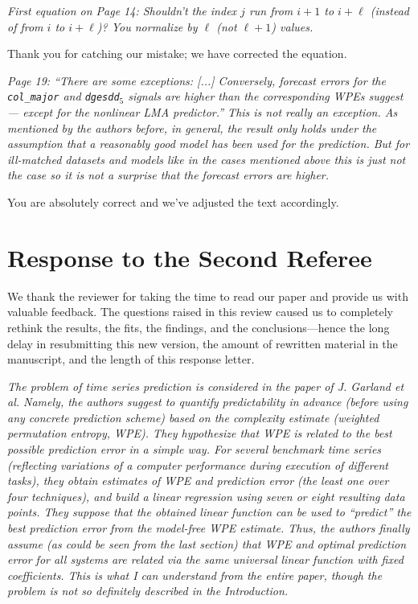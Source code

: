 \documentclass[12pt]{article}
\begin{document}
\emph{First equation on Page 14: Shouldn't the index $j$ run from $i+1$ to
$i+\ell$ (instead of from $i$ to $i+\ell$)? You normalize by $\ell$ (not
$\ell+1$) values.}

Thank you for catching our mistake; we have corrected the equation.

\smallskip

\emph{Page 19: ``There are some exceptions: [...] Conversely, forecast errors
for the \texttt{col\_major} and \texttt{dgesdd$_5$} signals are higher than the
corresponding WPEs suggest --- except for the nonlinear LMA predictor.'' This is
not really an exception. As mentioned by the authors before, in general, the
result only holds under the assumption that a reasonably good model has been
used for the prediction. But for ill-matched datasets and models like in the
cases mentioned above this is just not the case so it is not a surprise that the
forecast errors are higher.}

You are absolutely correct and we've adjusted the text accordingly.

\section*{Response to the Second Referee}

We thank the reviewer for taking the time to read our paper and
provide us with valuable feedback.  The questions raised in this
review caused us to completely rethink the results, the fits, the
findings, and the conclusions---hence the long delay in resubmitting
this new version, the amount of rewritten material in the manuscript,
and the length of this response letter.

\smallskip

\emph{The problem of time series prediction is considered in the paper
  of J.  Garland et al. Namely, the authors suggest to quantify
  predictability in advance (before using any concrete prediction
  scheme) based on the complexity estimate (weighted permutation
  entropy, WPE). They hypothesize that WPE is related to the best
  possible prediction error in a simple way. For several benchmark
  time series (reflecting variations of a computer performance during
  execution of different tasks), they obtain estimates of WPE and
  prediction error (the least one over four techniques), and build a
  linear regression using seven or eight resulting data points. They
  suppose that the obtained linear function can be used to ``predict''
  the best prediction error from the model-free WPE estimate.  Thus,
  the authors finally assume (as could be seen from the last section)
  that WPE and optimal prediction error for all systems are related
  via the same universal linear function with fixed coefficients. This
  is what I can understand from the entire paper, though the problem
  is not so definitely described in the Introduction.}
\end{document}

